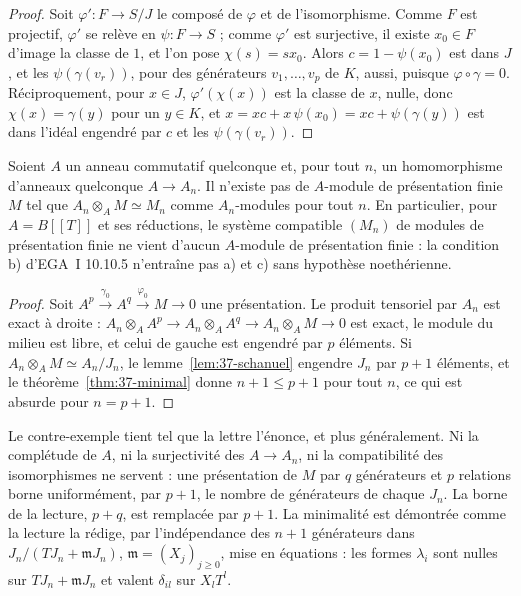 \begin{proof}
Soit $\varphi' : F \to S/J$ le composé de $\varphi$ et de l'isomorphisme. Comme $F$ est projectif, $\varphi'$ se relève en $\psi : F \to S$ ; comme $\varphi'$ est surjective, il existe $x_0 \in F$ d'image la classe de $1$, et l'on pose $\chi(s) = s x_0$. Alors $c = 1 - \psi(x_0)$ est dans $J$, et les $\psi(\gamma(v_r))$, pour des générateurs $v_1, \ldots, v_p$ de $K$, aussi, puisque $\varphi \circ \gamma = 0$. Réciproquement, pour $x \in J$, $\varphi'(\chi(x))$ est la classe de $x$, nulle, donc $\chi(x) = \gamma(y)$ pour un $y \in K$, et $x = xc + x\,\psi(x_0) = xc + \psi(\gamma(y))$ est dans l'idéal engendré par $c$ et les $\psi(\gamma(v_r))$.
\end{proof}

\begin{encadre}
\begin{theoreme}\label{thm:37-contre}
Soient $A$ un anneau commutatif quelconque et, pour tout $n$, un homomorphisme d'anneaux quelconque $A \to A_n$. Il n'existe pas de $A$-module de présentation finie $M$ tel que $A_n \otimes_A M \simeq M_n$ comme $A_n$-modules pour tout $n$. En particulier, pour $A = B[[T]]$ et ses réductions, le système compatible $(M_n)$ de modules de présentation finie ne vient d'aucun $A$-module de présentation finie : la condition b) d'EGA~I 10.10.5 n'entraîne pas a) et c) sans hypothèse noethérienne.
\end{theoreme}
\end{encadre}

\begin{proof}
Soit $A^p \xrightarrow{\gamma_0} A^q \xrightarrow{\varphi_0} M \to 0$ une présentation. Le produit tensoriel par $A_n$ est exact à droite : $A_n \otimes_A A^p \to A_n \otimes_A A^q \to A_n \otimes_A M \to 0$ est exact, le module du milieu est libre, et celui de gauche est engendré par $p$ éléments. Si $A_n \otimes_A M \simeq A_n/J_n$, le lemme~\ref{lem:37-schanuel} engendre $J_n$ par $p + 1$ éléments, et le théorème~\ref{thm:37-minimal} donne $n + 1 \leq p + 1$ pour tout $n$, ce qui est absurde pour $n = p + 1$.
\end{proof}

\begin{remarque}
Le contre-exemple tient tel que la lettre l'énonce, et plus généralement. Ni la complétude de $A$, ni la surjectivité des $A \to A_n$, ni la compatibilité des isomorphismes ne servent : une présentation de $M$ par $q$ générateurs et $p$ relations borne uniformément, par $p + 1$, le nombre de générateurs de chaque $J_n$. La borne de la lecture, $p + q$, est remplacée par $p + 1$. La minimalité est démontrée comme la lecture la rédige, par l'indépendance des $n+1$ générateurs dans $J_n/(TJ_n + \mathfrak m J_n)$, $\mathfrak m = (X_j)_{j \geq 0}$, mise en équations : les formes $\lambda_i$ sont nulles sur $TJ_n + \mathfrak m J_n$ et valent $\delta_{il}$ sur $X_lT^l$.
\end{remarque}


